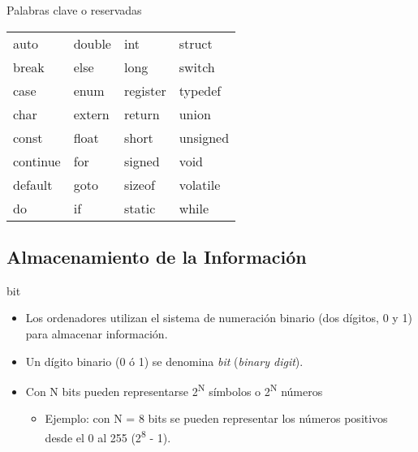 \documentclass[xcolor={usenames,svgnames,dvipsnames}, aspectratio=169]{beamer}
\begin{document}
\begin{frame}[label={sec:orgabff0db}]{Palabras clave o reservadas}
\begin{center}
\begin{tabular}{llll}
auto & double & int & struct\\
break & else & long & switch\\
case & enum & register & typedef\\
char & extern & return & union\\
const & float & short & unsigned\\
continue & for & signed & void\\
default & goto & sizeof & volatile\\
do & if & static & while\\
\end{tabular}
\end{center}
\end{frame}

\subsection{Almacenamiento de la Información}
\label{sec:org3a98476}

\begin{frame}[label={sec:org23b1f2a}]{bit}
\begin{itemize}
\item Los ordenadores utilizan el sistema de numeración binario (dos dígitos, 0 y 1) para almacenar información.

\item Un \alert{dígito binario} (0 ó 1) se denomina \emph{bit} (\emph{binary digit}).

\item Con \alert{N bits} pueden representarse \alert{2\textsuperscript{N} símbolos o 2\textsuperscript{N} números}

\begin{itemize}
\item Ejemplo: con N = 8 bits se pueden representar los números positivos desde el 0 al 255 (2\textsuperscript{8} - 1).
\end{itemize}
\end{itemize}
\end{frame}
\end{document}
